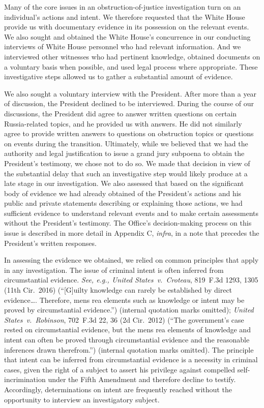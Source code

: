 Many of the core issues in an obstruction-of-justice investigation turn on an individual's actions and intent.
We therefore requested that the White House provide us with documentary evidence in its possession on the relevant events.
We also sought and obtained the White House's concurrence in our conducting interviews of White House personnel who had relevant information.
And we interviewed other witnesses who had pertinent knowledge, obtained documents on a voluntary basis when possible, and used legal process where appropriate.
These investigative steps allowed us to gather a substantial amount of evidence.

We also sought a voluntary interview with the President.
After more than a year of discussion, the President declined to be interviewed.
During the course of our discussions, the President did agree to answer written questions on certain Russia-related topics, and he provided us with answers.
He did not similarly agree to provide written answers to questions on obstruction topics or questions on events during the transition.
Ultimately, while we believed that we had the authority and legal justification to issue a grand jury subpoena to obtain the President's testimony, we chose not to do so.
We made that decision in view of the substantial delay that such an investigative step would likely produce at a late stage in our investigation.
We also assessed that based on the significant body of evidence we had already obtained of the President's actions and his public and private statements describing or explaining those actions, we had sufficient evidence to understand relevant events and to make certain assessments without the President's testimony.
The Office's decision-making process on this issue is described in more detail in Appendix C, \textit{infra}, in a note that precedes the President's written responses.

In assessing the evidence we obtained, we relied on common principles that apply in any investigation.
The issue of criminal intent is often inferred from circumstantial evidence.
\textit{See, e.g., United States~v.\ Croteau}, 819~F.3d 1293, 1305 (11th Cir.~2016) (``[G]uilty knowledge can rarely be established by direct evidence\dots.
Therefore, mens rea elements such as knowledge or intent may be proved by circumstantial evidence.'') (internal quotation marks omitted);
\textit{United States~v.\ Robinson}, 702~F.3d 22, 36 (2d Cir.~2012) (``The government's case rested on circumstantial evidence, but the mens rea elements of knowledge and intent can often be proved through circumstantial evidence and the reasonable inferences drawn therefrom.'') (internal quotation marks omitted).
The principle that intent can be inferred from circumstantial evidence is a necessity in criminal cases, given the right of a subject to assert his privilege against compelled self-incrimination under the Fifth Amendment and therefore decline to testify.
Accordingly, determinations on intent are frequently reached without the opportunity to interview an investigatory subject.

